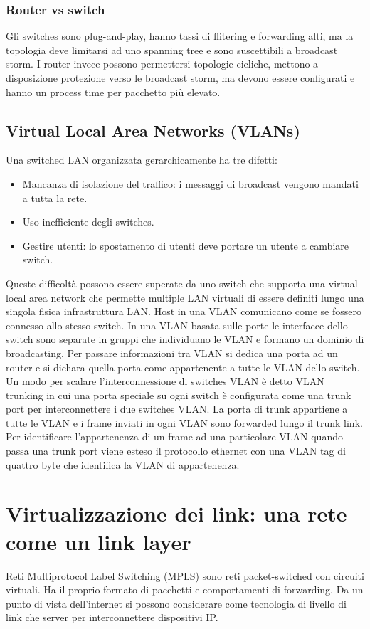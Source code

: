 \subsubsection{Router vs switch}
Gli switches sono plug-and-play, hanno tassi di flitering e forwarding alti, ma la topologia deve limitarsi ad uno spanning tree e sono suscettibili a broadcast storm. I router invece possono permettersi topologie
cicliche, mettono a disposizione protezione verso le broadcast storm, ma devono essere configurati e hanno un process time per pacchetto pi\`u elevato.
\subsection{Virtual Local Area Networks (VLANs)}
Una switched LAN organizzata gerarchicamente ha tre difetti:
\begin{itemize}
\item Mancanza di isolazione del traffico: i messaggi di broadcast vengono mandati a tutta la rete. 
\item Uso inefficiente degli switches. 
\item Gestire utenti: lo spostamento di utenti deve portare un utente a cambiare switch.
\end{itemize}
Queste difficolt\`a possono essere superate da uno switch che supporta una virtual local area network che permette multiple LAN virtuali di essere definiti lungo una singola fisica infrastruttura LAN.  Host in
una VLAN comunicano come se fossero connesso allo stesso switch. In una VLAN basata sulle porte le interfacce dello switch sono separate in gruppi che individuano le VLAN e formano un dominio di 
broadcasting. Per passare informazioni tra VLAN si dedica una porta ad un router e si dichara quella porta come appartenente a tutte le VLAN dello switch. Un modo per scalare l'interconnessione di switches
VLAN \`e detto VLAN trunking in cui una porta speciale su ogni switch \`e configurata come una trunk port per interconnettere i due switches VLAN. La porta di trunk appartiene a tutte le VLAN e i frame inviati
in ogni VLAN sono forwarded lungo il trunk link. Per identificare l'appartenenza di un frame ad una particolare VLAN quando passa una trunk port viene esteso il protocollo ethernet con una VLAN tag di 
quattro byte che identifica la VLAN di appartenenza. 
\section{Virtualizzazione dei link: una rete come un link layer}
Reti Multiprotocol Label Switching (MPLS) sono reti packet-switched con circuiti virtuali. Ha il proprio formato di pacchetti e comportamenti di forwarding. Da un punto di vista dell'internet si possono
considerare come tecnologia di livello di link che server per interconnettere dispositivi IP. 
